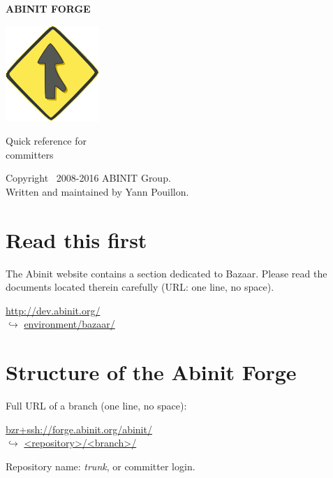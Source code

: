 \documentclass[tumble,foldmark,a4paper]{leaflet}
\begin{document}
\begin{center}
{\Large {\bf ABINIT FORGE}}

\vspace{32mm}

\includegraphics{bzr-logo}

\vspace{24mm}

{\Huge Quick reference for \\[0.5em] committers}

\vspace{40mm}

Copyright \textcopyright\ 2008-2016 ABINIT Group. \\
Written and maintained by Yann Pouillon.
\end{center}

\newpage

\section*{Read this first}

The Abinit website contains a section dedicated to Bazaar. Please read
the documents located therein carefully (URL: one line, no space).
\begin{center}
 \url{http://dev.abinit.org/} \\
 $\hookrightarrow$ \url{environment/bazaar/}
\end{center}

\section*{Structure of the Abinit Forge}

Full URL of a branch (one line, no space):
\begin{center}
 \url{bzr+ssh://forge.abinit.org/abinit/} \\
 $\hookrightarrow$ \url{<repository>/<branch>/}
\end{center}

Repository name: \textit{trunk}, or committer login. \\
\end{document}
